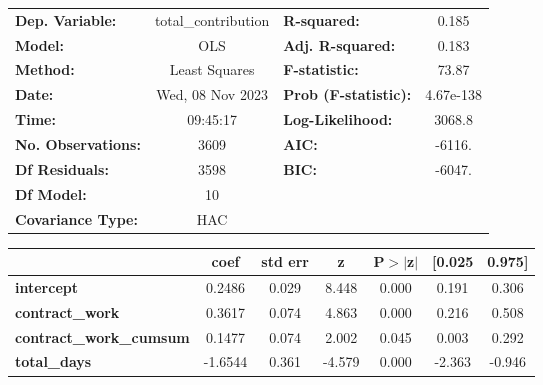 \begin{center}
\begin{tabular}{lclc}
\toprule
\textbf{Dep. Variable:}                  & total\_contribution & \textbf{  R-squared:         } &     0.185   \\
\textbf{Model:}                          &         OLS         & \textbf{  Adj. R-squared:    } &     0.183   \\
\textbf{Method:}                         &    Least Squares    & \textbf{  F-statistic:       } &     73.87   \\
\textbf{Date:}                           &   Wed, 08 Nov 2023  & \textbf{  Prob (F-statistic):} & 4.67e-138   \\
\textbf{Time:}                           &       09:45:17      & \textbf{  Log-Likelihood:    } &    3068.8   \\
\textbf{No. Observations:}               &          3609       & \textbf{  AIC:               } &    -6116.   \\
\textbf{Df Residuals:}                   &          3598       & \textbf{  BIC:               } &    -6047.   \\
\textbf{Df Model:}                       &            10       & \textbf{                     } &             \\
\textbf{Covariance Type:}                &         HAC         & \textbf{                     } &             \\
\bottomrule
\end{tabular}
\begin{tabular}{lcccccc}
                                         & \textbf{coef} & \textbf{std err} & \textbf{z} & \textbf{P$> |$z$|$} & \textbf{[0.025} & \textbf{0.975]}  \\
\midrule
\textbf{intercept}                       &       0.2486  &        0.029     &     8.448  &         0.000        &        0.191    &        0.306     \\
\textbf{contract\_work}                  &       0.3617  &        0.074     &     4.863  &         0.000        &        0.216    &        0.508     \\
\textbf{contract\_work\_cumsum}          &       0.1477  &        0.074     &     2.002  &         0.045        &        0.003    &        0.292     \\
\textbf{total\_days}                     &      -1.6544  &        0.361     &    -4.579  &         0.000        &       -2.363    &       -0.946     \\

\end{tabular}
\end{center}
